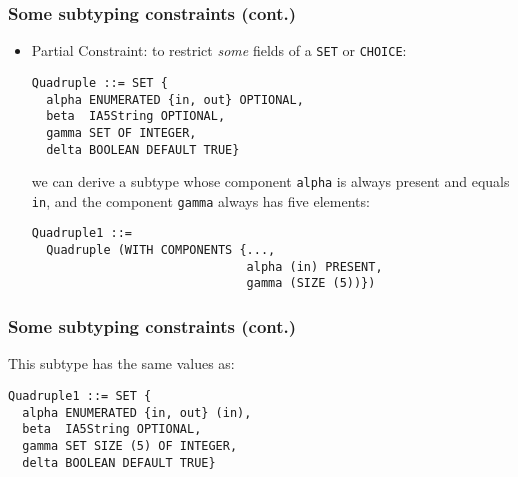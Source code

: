 \documentclass[compress,dvips,xcolor={dvipsnames},t]{beamer}
\begin{document}
\begin{frame}[containsverbatim]
\frametitle{Some subtyping constraints (cont.)}

\begin{itemize}
  \item \textsf{Partial Constraint}: to restrict \emph{some} fields
        of a \texttt{SET} or \texttt{CHOICE}:

\begin{verbatim}
Quadruple ::= SET {
  alpha ENUMERATED {in, out} OPTIONAL,
  beta  IA5String OPTIONAL,
  gamma SET OF INTEGER,
  delta BOOLEAN DEFAULT TRUE}
\end{verbatim}

we can derive a subtype whose component \verb+alpha+ is always present
and equals \verb+in+, and the component \verb+gamma+ always has
five elements:
\begin{verbatim}
Quadruple1 ::=
  Quadruple (WITH COMPONENTS {..., 
                              alpha (in) PRESENT,  
                              gamma (SIZE (5))})
\end{verbatim}

\end{itemize}

\end{frame}

\begin{frame}[containsverbatim]
\frametitle{Some subtyping constraints (cont.)}

This subtype has the same values as:
\begin{verbatim}
Quadruple1 ::= SET {
  alpha ENUMERATED {in, out} (in),
  beta  IA5String OPTIONAL,
  gamma SET SIZE (5) OF INTEGER,
  delta BOOLEAN DEFAULT TRUE}
\end{verbatim}

\end{frame}
\end{document}
